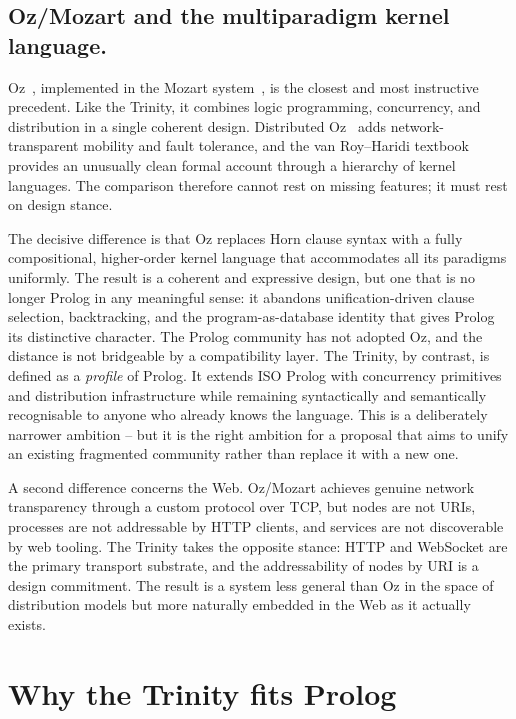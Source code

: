 \subsection{Oz/Mozart and the multiparadigm kernel language.}
Oz~\citep{smolka1995oz}, implemented in the Mozart
system~\citep{vanroy2003logic}, is the closest and most instructive
precedent. Like the Trinity, it combines logic programming, concurrency,
and distribution in a single coherent design. Distributed
Oz~\citep{vanroy1997distributed} adds network-transparent mobility and
fault tolerance, and the van Roy--Haridi
textbook~\citep{vanroy2004concepts} provides an unusually clean formal
account through a hierarchy of kernel languages. The comparison
therefore cannot rest on missing features; it must rest on design
stance.

The decisive difference is that Oz replaces Horn clause syntax with a
fully compositional, higher-order kernel language that accommodates all
its paradigms uniformly. The result is a coherent and expressive design,
but one that is no longer Prolog in any meaningful sense: it abandons
unification-driven clause selection, backtracking, and the program-as-database
identity that gives Prolog its distinctive character. The Prolog
community has not adopted Oz, and the distance is not bridgeable by a
compatibility layer. The Trinity, by contrast, is defined as a
\emph{profile} of Prolog. It extends ISO Prolog with concurrency
primitives and distribution infrastructure while remaining syntactically
and semantically recognisable to anyone who already knows the language.
This is a deliberately narrower ambition -- but it is the right ambition
for a proposal that aims to unify an existing fragmented community
rather than replace it with a new one.

A second difference concerns the Web. Oz/Mozart achieves genuine network
transparency through a custom protocol over TCP, but nodes are not URIs,
processes are not addressable by HTTP clients, and services are not
discoverable by web tooling. The Trinity takes the opposite stance: HTTP
and WebSocket are the primary transport substrate, and the
addressability of nodes by URI is a design commitment. The result is a
system less general than Oz in the space of distribution models but more
naturally embedded in the Web as it actually exists.


\section{Why the Trinity fits Prolog}\label{sec:why-prolog-trinity}

